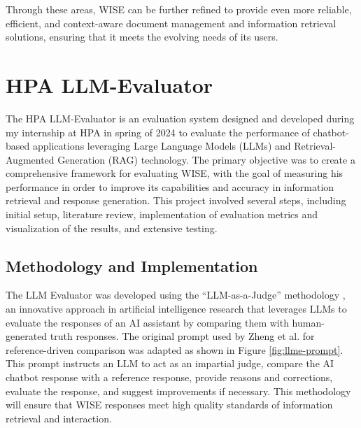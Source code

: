 Through these areas, WISE can be further refined to provide even more reliable, efficient, and context-aware document management and information retrieval solutions, ensuring that it meets the evolving needs of its users.

\newpage

\section{HPA LLM-Evaluator}

The HPA LLM-Evaluator is an evaluation system designed and developed during my internship at HPA in spring of 2024 to evaluate the performance of chatbot-based applications leveraging Large Language Models (LLMs) and Retrieval-Augmented Generation (RAG) technology. The primary objective was to create a comprehensive framework for evaluating WISE, with the goal of measuring his performance in order to improve its capabilities and accuracy in information retrieval and response generation. This project involved several steps, including initial setup, literature review, implementation of evaluation metrics and visualization of the results, and extensive testing.

\subsection{Methodology and Implementation}

The LLM Evaluator was developed using the “LLM-as-a-Judge” methodology \cite{zheng2024judging}, an innovative approach in artificial intelligence research that leverages LLMs to evaluate the responses of an AI assistant by comparing them with human-generated truth responses. The original prompt used by Zheng et al. \cite{zheng2024judging} for reference-driven comparison was adapted as shown in Figure \ref{fig:llme-prompt}. This prompt instructs an LLM to act as an impartial judge, compare the AI chatbot response with a reference response, provide reasons and corrections, evaluate the response, and suggest improvements if necessary. This methodology will ensure that WISE responses meet high quality standards of information retrieval and interaction.

